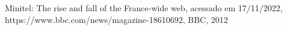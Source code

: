 \documentclass[
12pt,		%
openright,	%
twoside,  %
a4paper,			%
chapter=TITLE,		%
english,			%
french,				%
spanish,			%
brazil				%
]{USPSC-classe/USPSC}
\begin{document}
\begin{flushleft}
\begin{flushleft}
\begin{flushleft}
\begin{flushleft}
\begin{flushleft}
\begin{flushleft}
\begin{flushleft}
\begin{flushleft}
\begin{flushleft}
\begin{flushleft}
[BBC, 2012] Minitel: The rise and fall of the France-wide web, acessado em 17/11/2022, https://www.bbc.com/news/magazine-18610692, BBC, 2012
\end{flushleft}


\end{flushleft}


\end{flushleft}


\end{flushleft}


\end{flushleft}


\end{flushleft}


\end{flushleft}


\end{flushleft}


\end{flushleft}


\end{flushleft}
\end{document}

